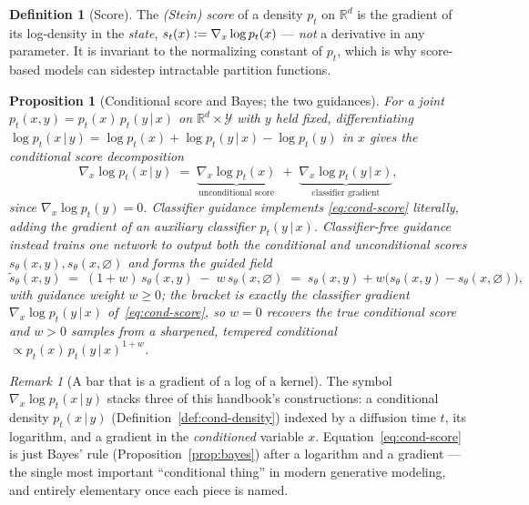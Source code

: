 \documentclass[11pt,oneside]{report}
\theoremstyle{plain}
\newtheorem{proposition}[theorem]{Proposition}
\theoremstyle{definition}
\newtheorem{definition}[theorem]{Definition}
\theoremstyle{remark}
\newtheorem{remark}[theorem]{Remark}
\newcommand{\R}{\mathbb{R}}
\newcommand{\Ycal}{\mathcal{Y}}
\newcommand{\defeq}{\vcentcolon=}
\newcommand{\given}{\,\vert\,}
\numberwithin{equation}{chapter}
\begin{document}
\begin{definition}[Score]
The \emph{(Stein) score} of a density $p_t$ on $\R^d$ is the gradient of its
log-density in the \emph{state}, $s_t(x)\defeq\nabla_x\log p_t(x)$ ---
\emph{not} a derivative in any parameter. It is invariant to the normalizing
constant of $p_t$, which is why score-based models can sidestep intractable
partition functions.
\end{definition}

\begin{proposition}[Conditional score and Bayes; the two guidances]
\label{prop:guidance}
For a joint $p_t(x,y)=p_t(x)\,p_t(y\given x)$ on $\R^d\times\Ycal$ with $y$
held fixed, differentiating $\log p_t(x\given y)=\log p_t(x)+\log
p_t(y\given x)-\log p_t(y)$ in $x$ gives the \emph{conditional score
decomposition}
\begin{equation}\label{eq:cond-score}
  \nabla_x\log p_t(x\given y)
  \;=\;\underbrace{\nabla_x\log p_t(x)}_{\text{unconditional score}}
   \;+\;\underbrace{\nabla_x\log p_t(y\given x)}_{\text{classifier gradient}} ,
\end{equation}
since $\nabla_x\log p_t(y)=0$. \emph{Classifier guidance} implements
\eqref{eq:cond-score} literally, adding the gradient of an auxiliary
classifier $p_t(y\given x)$. \emph{Classifier-free guidance} instead trains
one network to output both the conditional and unconditional scores
$s_\theta(x,y),s_\theta(x,\varnothing)$ and forms the guided field
\begin{equation}\label{eq:cfg}
  \widetilde s_\theta(x,y)
   \;=\;(1+w)\,s_\theta(x,y)\;-\;w\,s_\theta(x,\varnothing)
   \;=\;s_\theta(x,y)+w\bigl(s_\theta(x,y)-s_\theta(x,\varnothing)\bigr),
\end{equation}
with guidance weight $w\ge0$; the bracket is exactly the classifier
gradient $\nabla_x\log p_t(y\given x)$ of~\eqref{eq:cond-score}, so
$w=0$ recovers the true conditional score and $w>0$ samples from a
sharpened, tempered conditional $\propto p_t(x)\,p_t(y\given x)^{1+w}$.
\end{proposition}

\begin{remark}[A bar that is a gradient of a log of a kernel]
The symbol $\nabla_x\log p_t(x\given y)$ stacks three of this handbook's
constructions: a conditional density $p_t(x\given y)$
(Definition~\ref{def:cond-density}) indexed by a diffusion time $t$, its
logarithm, and a gradient in the \emph{conditioned} variable $x$.
Equation~\eqref{eq:cond-score} is just Bayes' rule
(Proposition~\ref{prop:bayes}) after a logarithm and a gradient --- the
single most important ``conditional thing'' in modern generative modeling,
and entirely elementary once each piece is named.
\end{remark}
\end{document}
